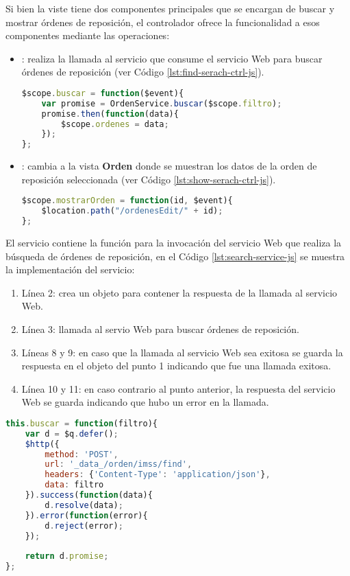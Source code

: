 Si bien la viste tiene dos componentes principales que se encargan de buscar y mostrar órdenes de reposición, el controlador  ofrece la funcionalidad a esos componentes mediante las operaciones:
\begin{itemize}
	\item {}: realiza la llamada al servicio que consume el servicio Web para buscar órdenes de reposición (ver Código \ref{lst:find-serach-ctrl-js}).
\begin{lstlisting}[language=Javascript, caption={Función para llamar el servicio de búsqueda de órdenes de reposición.}, captionpos=b, label={lst:find-serach-ctrl-js}]
$scope.buscar = function($event){
	var promise = OrdenService.buscar($scope.filtro);
	promise.then(function(data){
		$scope.ordenes = data;
	});
};
\end{lstlisting}

	\item {}: cambia a la vista \textbf{Orden} donde se muestran los datos de la orden de reposición seleccionada (ver Código \ref{lst:show-serach-ctrl-js}).
\begin{lstlisting}[language=Javascript, caption={Función para mostrar la vista de una orden de reposición.}, captionpos=b, label={lst:show-search-ctrl-js}]
$scope.mostrarOrden = function(id, $event){
	$location.path("/ordenesEdit/" + id);
};
\end{lstlisting}
\end{itemize}

El servicio  contiene la función para la invocación del servicio Web que realiza la búsqueda de órdenes de reposición, en el Código \ref{lst:search-service-js} se muestra la implementación del servicio:
\begin{enumerate}
	\item Línea 2: crea un objeto para contener la respuesta de la llamada al servicio Web.
	\item Línea 3: llamada al servio Web para buscar órdenes de reposición.
	\item Líneas 8 y 9: en caso que la llamada al servicio Web sea exitosa se guarda la respuesta en el objeto del punto 1 indicando que fue una llamada exitosa.
	\item Línea 10 y 11: en caso contrario al punto anterior, la respuesta del servicio Web se guarda indicando que hubo un error en la llamada.
\end{enumerate}

\begin{lstlisting}[language=Javascript, caption={Servicio de AngularJS para buscar órdenes de reposición.}, captionpos=b, label={lst:search-service-js}]
this.buscar = function(filtro){
	var d = $q.defer();
	$http({
		method: 'POST',
		url: '_data_/orden/imss/find',
		headers: {'Content-Type': 'application/json'},
		data: filtro
	}).success(function(data){
		d.resolve(data);
	}).error(function(error){
		d.reject(error);
	});
	
	return d.promise;
};
\end{lstlisting}

